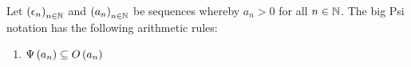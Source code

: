 \begin{theorem} \label{thm:bigpsi:rules}
  Let $\left({\epsilon_n}\right)_{{n}\in\mathbb N}$ and $\left({a_n}\right)_{{n}\in\mathbb N}$ be sequences whereby $a_n > 0$ for all $n\in\mathbb N$. The big Psi notation has the following arithmetic rules:

  \begin{enumerate}
    \item $\Psi\left( {a_n} \right) \subseteq O\left( {a_n} \right)$
  \end{enumerate}
\end{theorem}
